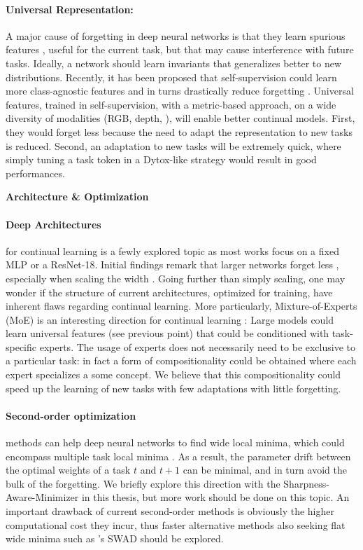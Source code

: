 \paragraph{Universal Representation:} A major cause of forgetting in deep neural networks is that
they learn spurious features \citep{lesort2022spuriousfeatures}, useful for the current task, but
that may cause interference with future tasks. Ideally, a network should learn invariants
\citep{arjovsky2019irm,rame2021fishr} that generalizes better to new distributions. Recently, it has
been proposed that self-supervision could learn more class-agnostic features and in turns
drastically reduce forgetting \citep{gallardo2021selfsupcontinual}. Universal
features, trained in self-supervision, with a metric-based approach, on a wide diversity of
modalities (RGB, depth, \etc), will enable better continual models. First, they would forget less
because the need to adapt the representation to new tasks is reduced. Second, an adaptation to new
tasks will be extremely quick, where simply tuning a task token in a Dytox-like strategy would
result in good performances.

\large{\textbf{Architecture \& Optimization}}


\paragraph{Deep Architectures} for continual learning is a fewly explored topic as most works focus
on a fixed MLP or a ResNet-18. Initial findings remark that larger networks forget less
\citep{ramasesh2022scalecontinual}, especially when scaling the width
\citep{mirzadeh2022widecontinualnetworks}. Going further than simply scaling, one may wonder if the
structure of current architectures, optimized for \iid training, have inherent flaws regarding
continual learning. More particularly, Mixture-of-Experts (MoE) is an interesting direction for
continual learning \citep{caccia2022anytimelearning}: Large models could learn universal features
(see previous point) that could be conditioned with task-specific experts. The usage of experts does
not necessarily need to be exclusive to a particular task: in fact a form of compositionality could
be obtained where each expert specializes a some concept. We believe that this compositionality
could speed up the learning of new tasks with few adaptations with little forgetting.

\paragraph{Second-order optimization} methods can help deep neural networks to find wide local
minima, which could encompass multiple task local minima \citep{lee2020kroneckercontinual}. As a
result, the parameter drift between the optimal weights of a task $t$ and $t+1$ can be minimal, and
in turn avoid the bulk of the forgetting. We briefly explore this direction with the
Sharpness-Aware-Minimizer \citep{foret2020sam} in this thesis, but more work should be done on this
topic. An important drawback of current second-order methods is obviously the higher computational
cost they incur, thus faster alternative methods also seeking flat wide minima such as
\citet{cha2021swad}'s SWAD should be explored.


